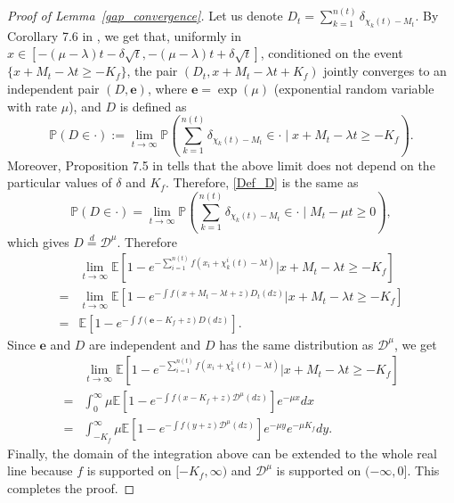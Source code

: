 \documentclass[a4paper,reqno]{amsart}%
\newcommand{\1}{\mathbf 1}
\theoremstyle{mine}
\numberwithin{theorem}{section}
\numberwithin{equation}{section}
\theoremstyle{remark}
\begin{document}
\begin{proof}[Proof of Lemma~\ref{gap_convergence}]
    Let us denote $D_t = \sum_{k = 1}^{n(t)}\delta_{\chi_k(t)-M_t}$. 
    By Corollary 7.6 in \cite{bovier2014extremal}, we get that, uniformly in $x\in[-(\mu -\lambda)t-\delta\sqrt{t},-(\mu -\lambda)t+\delta\sqrt{t}]$, conditioned on the event $\{x+M_t-\lambda t \ge -K_{f} \}$, the pair $(D_t, x+M_{t}-\lambda t +K_{f})$ jointly converges to an independent pair $(D,\textbf{e})$, where $\textbf{e}=\exp(\mu)$ (exponential random variable with rate $\mu$), and $D$ is defined as 
    \begin{equation}\label{Def_D}
        \mathbb{P}\left(D \in \cdot \right):= \lim_{t\to\infty}\mathbb{P}\left(\sum_{k = 1}^{n(t)}\delta_{\chi_k(t)-M_t}\in \cdot\mid x+M_t-\lambda t \ge -K_{f}\right).
    \end{equation}
    Moreover, Proposition 7.5 in \cite{bovier2014extremal} tells that the above limit does not depend on the particular values of $\delta$ and $K_{f}$. Therefore, \eqref{Def_D} is the same as 
    \begin{equation}
        \mathbb{P}\left(D \in \cdot \right)= \lim_{t\to\infty}\mathbb{P}\left(\sum_{k = 1}^{n(t)}\delta_{\chi_k(t)-M_t}\in \cdot\mid M_t-\mu t\ge 0\right),
    \end{equation}
    which gives $D \stackrel{d}{=}\mathcal D^{\mu}$.
   Therefore
    \begin{equation}
    \begin{aligned}
        &\lim_{t\to\infty}\mathbb{E}[1-e^{-\sum_{i = 1}^{n(t)} f(x_{i}+\chi_{k}^{i}(t) - \lambda t)}|x+M_{t} -\lambda t\ge -K_{f}] \\
        =&\lim_{t\to\infty}\mathbb{E}[1-e^{-\int f(x+M_t-\lambda t + z)D_{t}(dz)}|x+M_{t} -\lambda t\ge -K_{f}]\\
        =&\mathbb{E}[1-e^{-\int f(\textbf{e}-K_f + z)D(dz)}].
         \end{aligned}
    \end{equation}
    Since $\textbf{e}$ and $D$ are independent and $D$ has the same distribution as $\mathcal D^{\mu}$, we get 
    \begin{equation}
        \begin{aligned}
            &\lim_{t\to\infty}\mathbb{E}[1-e^{-\sum_{i = 1}^{n(t)} f(x_{i}+\chi_{k}^{i}(t) - \lambda t)}|x+M_{t} -\lambda t\ge -K_{f}] \\
        =&\int_{0}^{\infty}\mu\mathbb{E}[1-e^{-\int f(x-K_{f}+z)\mathcal D^{\mu}(dz)}]e^{-\mu x}dx\\
        =&\int_{-K_{f}}^{\infty}\mu\mathbb{E}[1-e^{-\int f(y+z)\mathcal D^{\mu}(dz)}]e^{-\mu y}e^{-\mu K_{f}}dy.
        \end{aligned}
    \end{equation}
    Finally, the domain of the integration above can be extended to the whole real line because $f$ is supported on $[-K_f,\infty)$ and $\mathcal D^{\mu}$ is supported on $(-\infty,0]$. This completes the proof.
\end{proof}
\end{document}
